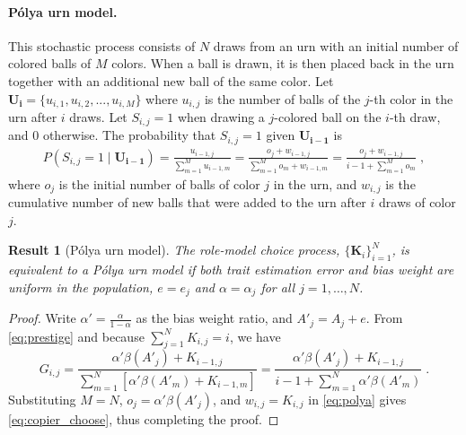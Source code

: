 \documentclass[12pt]{extarticle}
\let\vec\mathbf
\newtheorem{result}{Result}
\begin{document}
\paragraph{P\'{o}lya urn model.}
This stochastic process consists of $N$ draws from an urn with an initial {number} of colored balls of $M$ colors. When a ball is drawn, it is then placed back in the urn together with an additional new ball of the same color.
Let $\vec{U_i} = \{u_{i,1},u_{i,2},...,u_{i,M}\}$  where $u_{i,j}$ is the number of balls of the $j$-th color in the urn after $i$ draws.
Let $S_{i,j}=1$ when drawing a $j$-colored ball on the $i$-th draw, and $0$ otherwise. The probability that $S_{i,j}=1$ given $\vec{U_{i-1}}$ is
\begin{equation}\label{eq:polya}
\begin{split}
P(S_{i,j} = 1 \mid \vec{U_{i-1}}) = 
\frac{u_{i-1,j}}{\sum\limits_{m=1}^{M} u_{i-1,m}} = 
\frac{o_j + w_{i-1,j}}{\sum\limits_{m=1}^{M} o_m + w_{i-1,m}} = 
\frac{o_j + w_{i-1,j}}{i-1 + \sum\limits_{m=1}^{M} o_m} \;,
\end{split}
\end{equation}
where $o_j$ is the initial number of balls of color $j$ in the urn, and $w_{i,j}$ is the cumulative number of new balls that were added to the urn after $i$ draws of color $j$.
\\

\begin{result}[P{\'{o}}lya urn model]\label{result:polya}
The role-model choice process, $\big\{\vec{K}_i\big\}_{i=1}^N$, is equivalent to a \emph{P\'{o}lya urn model} if both trait estimation error and bias weight are uniform in the population, $e=e_j$ and $\alpha=\alpha_j$ for all $j=1,\ldots,N$.
\end{result}

\begin{proof} 
{Write} $\alpha'=\frac{\alpha}{1-\alpha}$ as the bias weight ratio, and $A'_j=A_j+e$. From \cref{eq:prestige} and because $\sum_{j=1}^{N}{K_{i,j}}=i$, we have
\begin{equation}\label{eq:copier_choose}
G_{i,j} = 
\frac{\alpha'\beta(A'_j) + K_{i-1,j}}{\sum\limits_{m=1}^{N}{\left[ \alpha'\beta(A'_m) + K_{i-1,m}\right]}}
 =\frac{\alpha'\beta(A'_j) + K_{i-1,j}}{i-1 + \sum\limits_{m=1}^{N}\alpha'\beta(A'_m)} \;.
\end{equation}
Substituting $M=N$, $o_j = \alpha'\beta(A'_j)$, and $w_{i,j} = K_{i,j}$ in \cref{eq:polya} gives \cref{eq:copier_choose}, thus completing the proof.
\end{proof} 
\end{document}
